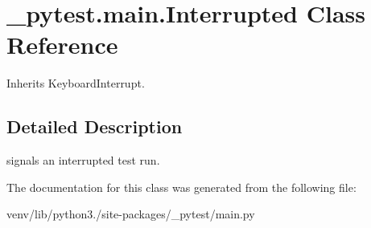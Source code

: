 \hypertarget{class__pytest_1_1main_1_1_interrupted}{}\section{\+\_\+pytest.\+main.\+Interrupted Class Reference}
\label{class__pytest_1_1main_1_1_interrupted}


Inherits Keyboard\+Interrupt.



\subsection{Detailed Description}
\begin{DoxyVerb}signals an interrupted test run. \end{DoxyVerb}
 

The documentation for this class was generated from the following file\+:\begin{DoxyCompactItemize}
\item 
venv/lib/python3./site-\/packages/\+\_\+pytest/main.\+py\end{DoxyCompactItemize}
